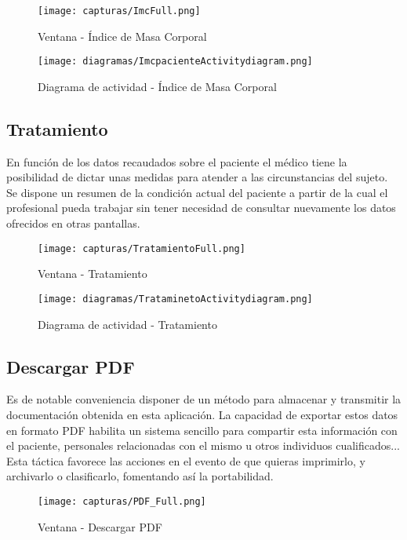 \documentclass[11pt,spanish,
		listoftables,listoffigures]
		{tfgplantilla}
\begin{document}
\begin{figure}[H]
\centering
\texttt{[image: capturas/ImcFull.png]}
\caption{Ventana - Índice de Masa Corporal}
\end{figure}

\begin{figure}[H]
\centering
\texttt{[image: diagramas/ImcpacienteActivitydiagram.png]}
\caption{Diagrama de actividad - Índice de Masa Corporal}
\end{figure}

\subsection {Tratamiento}

En función de los datos recaudados sobre el paciente el médico tiene la posibilidad de dictar unas medidas para atender a las circunstancias del sujeto. Se dispone un resumen de la condición actual del paciente a partir de la cual el profesional pueda trabajar sin tener necesidad de consultar nuevamente los datos ofrecidos en otras pantallas.

\begin{figure}[H]
\centering
\texttt{[image: capturas/TratamientoFull.png]}
\caption{Ventana - Tratamiento}
\end{figure}

\begin{figure}[H]
\centering
\texttt{[image: diagramas/TrataminetoActivitydiagram.png]}
\caption{Diagrama de actividad - Tratamiento}
\end{figure}

\subsection {Descargar PDF}

Es de notable conveniencia disponer de un método para almacenar y transmitir la documentación obtenida en esta aplicación. La capacidad de exportar estos datos en formato PDF habilita un sistema sencillo para compartir esta información con el paciente, personales relacionadas con el mismo u otros individuos cualificados...  Esta táctica favorece las acciones en el evento de que quieras imprimirlo, y archivarlo o clasificarlo, fomentando así la portabilidad.

\begin{figure}[H]
\centering
\texttt{[image: capturas/PDF\_Full.png]}
\caption{Ventana - Descargar PDF}
\end{figure}
\end{document}
